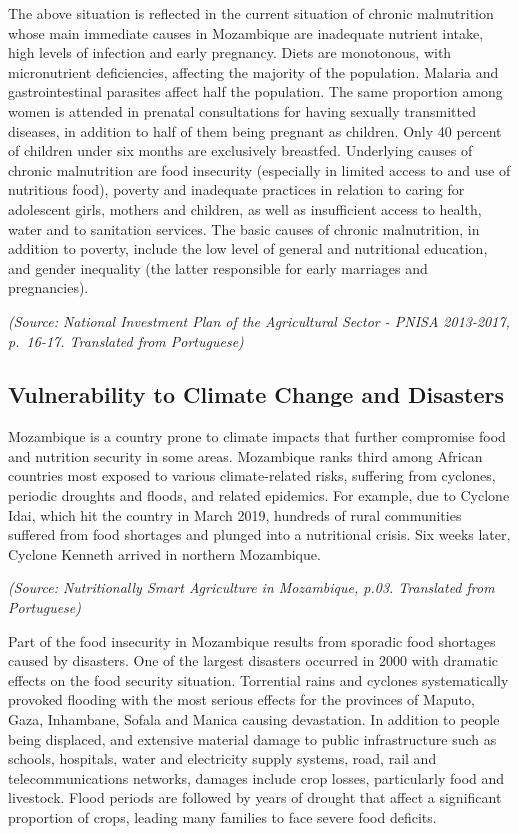 \documentclass[
]{book}
\begin{document}
The above situation is reflected in the current situation of chronic malnutrition whose main immediate causes in Mozambique are inadequate nutrient intake, high levels of infection and early pregnancy. Diets are monotonous, with micronutrient deficiencies, affecting the majority of the population. Malaria and gastrointestinal parasites affect half the population. The same proportion among women is attended in prenatal consultations for having sexually transmitted diseases, in addition to half of them being pregnant as children. Only 40 percent of children under six months are exclusively breastfed. Underlying causes of chronic malnutrition are food insecurity (especially in limited access to and use of nutritious food), poverty and inadequate practices in relation to caring for adolescent girls, mothers and children, as well as insufficient access to health, water and to sanitation services. The basic causes of chronic malnutrition, in addition to poverty, include the low level of general and nutritional education, and gender inequality (the latter responsible for early marriages and pregnancies).

\emph{(Source: National Investment Plan of the Agricultural Sector - PNISA 2013-2017, p.~16-17. Translated from Portuguese)}

\hypertarget{vulnerability-to-climate-change-and-disasters-2}{%
\subsection{Vulnerability to Climate Change and Disasters}\label{vulnerability-to-climate-change-and-disasters-2}}

Mozambique is a country prone to climate impacts that further compromise food and nutrition security in some areas. Mozambique ranks third among African countries most exposed to various climate-related risks, suffering from cyclones, periodic droughts and floods, and related epidemics. For example, due to Cyclone Idai, which hit the country in March 2019, hundreds of rural communities suffered from food shortages and plunged into a nutritional crisis. Six weeks later, Cyclone Kenneth arrived in northern Mozambique.

\emph{(Source: Nutritionally Smart Agriculture in Mozambique, p.03. Translated from Portuguese)}

Part of the food insecurity in Mozambique results from sporadic food shortages caused by disasters. One of the largest disasters occurred in 2000 with dramatic effects on the food security situation. Torrential rains and cyclones systematically provoked flooding with the most serious effects for the provinces of Maputo, Gaza, Inhambane, Sofala and Manica causing devastation. In addition to people being displaced, and extensive material damage to public infrastructure such as schools, hospitals, water and electricity supply systems, road, rail and telecommunications networks, damages include crop losses, particularly food and livestock. Flood periods are followed by years of drought that affect a significant proportion of crops, leading many families to face severe food deficits.
\end{document}
